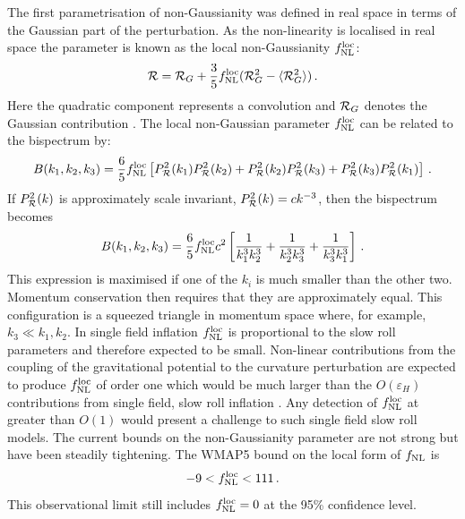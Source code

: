 The first parametrisation of non-Gaussianity was defined in
real space in terms of the Gaussian part of the perturbation. As the
non-linearity is localised in real space the parameter is
known as the local non-Gaussianity $f_{\mathrm{NL}}^\mathrm{loc}$: 
% 
\begin{equation} 
\label{eq:fnllocdefn-intro}
{\cal{R}} = {\cal{R}}_G + \frac{3}{5} f_{\mathrm{NL}}^\mathrm{loc}  (
{\cal{R}}_G^2 -\langle {\cal{R}}_G^2 \rangle )\,.
\end{equation}
Here the 
quadratic component represents a convolution and 
$\mathcal{R}_G$ denotes the Gaussian contribution
\cite{Maldacena:2002vr}\footnotemark.
The local non-Gaussian parameter $f_{\mathrm{NL}}^\mathrm{loc}$ can be related to the bispectrum by:
\begin{equation}
 B(k_1, k_2, k_3) = \frac{6}{5}f_{\mathrm{NL}}^\mathrm{loc} \left[P_{\mathcal{R}}^2(k_1)P_{\mathcal{R}}^2(k_2) +
P_{\mathcal{R}}^2(k_2)P_{\mathcal{R}}^2(k_3) + P_{\mathcal{R}}^2(k_3)P_{\mathcal{R}}^2(k_1)\right]\,.
\end{equation}
% 
If $P_{\mathcal{R}}^2(k)$ is approximately scale invariant, $P_{\mathcal{R}}^2(k) = c k^{-3}$, then
the bispectrum becomes \cite{Baumann2009}
% 
\begin{equation}
 B(k_1, k_2, k_3) = \frac{6}{5}f_{\mathrm{NL}}^\mathrm{loc} c^2\left[\frac{1}{k_1^3 k_2^3} +
\frac{1}{k_2^3 k_3^3} + \frac{1}{k_3^3 k_1^3}\right]\,.
\end{equation}
% 
This expression is maximised if one of the $k_i$ is much smaller than the other two.
Momentum
conservation then requires that they are approximately equal. This
configuration is a squeezed triangle in momentum space where, for example, $k_3 \ll
k_1,k_2$. In
single field inflation $f_{\mathrm{NL}}^\mathrm{loc}$ is proportional to the slow roll parameters
and therefore expected to be small. Non-linear contributions from the coupling
of the gravitational potential to the curvature perturbation are expected to
produce $f_{\mathrm{NL}}^\mathrm{loc}$ of order one which would be much larger than the
$O(\varepsilon_H)$ contributions from single field, slow roll inflation
\cite{Bartolo:2004if, Komatsu:2008hk}. Any detection of $f_{\mathrm{NL}}^\mathrm{loc}$ at greater
than $O(1)$ would present a challenge to such single field slow roll models. 
The current bounds on the non-Gaussianity parameter are not strong but have
been steadily tightening. The WMAP5 bound on the local form of $f_{\mathrm{NL}}$ is
% 
\begin{equation}
\label{eq:fnlloc-wmap5-intro}
 -9<f_{\mathrm{NL}}^\mathrm{loc}<111\,.
\end{equation}
% 
This observational limit still includes $f_{\mathrm{NL}}^\mathrm{loc}=0$ at the 95\% confidence level.


